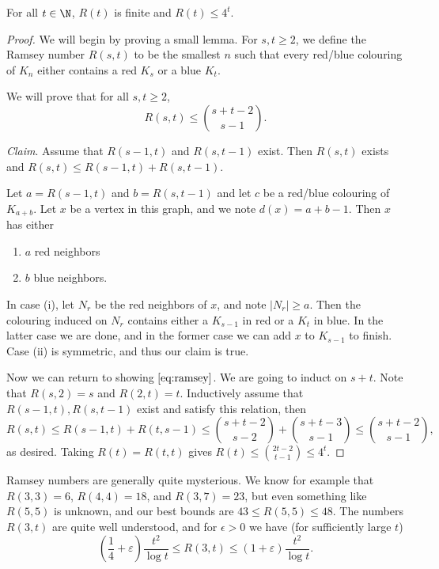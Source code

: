 \documentclass[a4paper]{scrartcl}
\begin{document}
\begin{theorem}
	For all $t \in \N$, $R(t)$ is finite and $R(t) \leq 4^t$.
\end{theorem}
\begin{proof}
	We will begin by proving a small lemma. For $s, t \geq 2$, we define the Ramsey number $R(s, t)$ to be the smallest $n$ such that every red/blue colouring of $K_n$ either contains a red $K_s$ or a blue $K_t$.

	We will prove that for all $s, t \geq 2$,
	\begin{equation}\label{eq:ramsey}
		R(s, t) \leq \binom{s + t - 2}{s - 1}.\tag{$\dagger$}
	\end{equation}

	\emph{Claim}. Assume that $R(s - 1, t)$ and $R(s, t - 1)$ exist. Then $R(s, t)$ exists and $R(s, t) \leq R(s-1, t) + R(s, t - 1)$.

	Let $a = R(s - 1, t)$ and $b = R(s, t - 1)$ and let $c$ be a red/blue colouring of $K_{a + b}$. Let $x$ be a vertex in this graph, and we note $d(x) = a + b - 1$. Then $x$ has either
	\begin{enumerate}[label=(\roman*)]
		\item $a$ red neighbors
		\item $b$ blue neighbors.
	\end{enumerate}
	In case (i), let $N_r$ be the red neighbors of $x$, and note $|N_r| \geq a$. Then the colouring induced on $N_r$ contains either a $K_{s - 1}$ in red or a $K_{t}$ in blue. In the latter case we are done, and in the former case we can add $x$ to $K_{s - 1}$ to finish. Case (ii) is symmetric, and thus our claim is true.

	Now we can return to showing $\eqref{eq:ramsey}$. We are going to induct on $s + t$. Note that $R(s, 2) = s$ and $R(2, t) = t$. Inductively assume that $R(s - 1, t), R(s, t - 1)$ exist and satisfy this relation, then
	$$
	R(s, t) \leq R(s - 1, t) + R(t, s - 1) \leq \binom{s + t - 2}{s - 2} + \binom{s + t - 3}{s - 1} \leq \binom{s + t - 2}{s - 1},
	$$
	as desired. Taking $R(t) = R(t, t)$ gives $R(t) \leq \binom{2t - 2}{t - 1} \leq 4^t$.
\end{proof}

Ramsey numbers are generally quite mysterious.
We know for example that
$R(3,3) = 6$, $R(4,4) = 18$, and $R(3,7) = 23$, 
but even something like $R(5, 5)$ is unknown, and our best bounds are $43 \leq R(5, 5) \leq 48$. The numbers $R(3, t)$ are quite well understood, and for $\epsilon > 0$ we have (for sufficiently large $t$)
$$
\left(\frac{1}{4}+\varepsilon\right) \frac{t^{2}}{\log t} \leqslant R(3, t) \leqslant(1+\varepsilon) \frac{t^{2}}{\log t}.
$$
\end{document}

